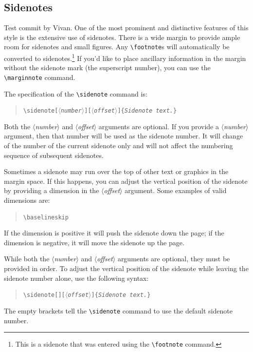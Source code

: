 \documentclass{tufte-handout}
\newcommand{\doccmd}[1]{\texttt{\textbackslash#1}}%
\newcommand{\docopt}[1]{\ensuremath{\langle}\textrm{\textit{#1}}\ensuremath{\rangle}}%
\newcommand{\docarg}[1]{\textrm{\textit{#1}}}%
\newenvironment{docspec}{\begin{quote}\noindent}{\end{quote}}%
\begin{document}
\subsection{Sidenotes}\label{sec:sidenotes}
Test commit by Vivan. One of the most prominent and distinctive features of this style is the
extensive use of sidenotes.  There is a wide margin to provide ample room
for sidenotes and small figures.  Any \Verb|\footnote|s will automatically
be converted to sidenotes.\footnote{This is a sidenote that was entered
using the \texttt{\textbackslash footnote} command.}  If you'd like to place ancillary
information in the margin without the sidenote mark (the superscript
number), you can use the \Verb|\marginnote| command.

The specification of the \Verb|\sidenote| command is:
\begin{docspec}
  \doccmd{sidenote[\docopt{number}][\docopt{offset}]\{\docarg{Sidenote text.}\}}
\end{docspec}

Both the \docopt{number} and \docopt{offset} arguments are optional.  If you
provide a \docopt{number} argument, then that number will be used as the
sidenote number.  It will change of the number of the current sidenote only and
will not affect the numbering sequence of subsequent sidenotes.

Sometimes a sidenote may run over the top of other text or graphics in the
margin space.  If this happens, you can adjust the vertical position of the
sidenote by providing a dimension in the \docopt{offset} argument.  Some
examples of valid dimensions are:
\begin{docspec}
  \ttfamily 1.0in \qquad 2.54cm \qquad 254mm \Verb|\baselineskip|
\end{docspec}
If the dimension is positive it will push the sidenote down the page; if the
dimension is negative, it will move the sidenote up the page.

While both the \docopt{number} and \docopt{offset} arguments are optional, they
must be provided in order.  To adjust the vertical position of the sidenote
while leaving the sidenote number alone, use the following syntax:
\begin{docspec}
  \doccmd{sidenote[][\docopt{offset}]\{\docarg{Sidenote text.}\}}
\end{docspec}
The empty brackets tell the \Verb|\sidenote| command to use the default
sidenote number.
\end{document}
